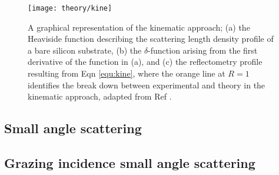 %
\begin{figure}
	\centering
	\texttt{[image: theory/kine]}
	\caption{A graphical representation of the kinematic approach; (a) the Heaviside function describing the scattering length density profile of a bare silicon substrate, (b) the $\delta$-function arising from the first derivative of the function in (a), and (c) the reflectometry profile resulting from Eqn \ref{equ:kine}, where the orange line at $R=1$ identifies the break down between experimental and theory in the kinematic approach, adapted from Ref \cite{Sivia2011}.}
	\label{fig:kine}
\end{figure}
%

\subsection{Small angle scattering}

\subsection{Grazing incidence small angle scattering}
